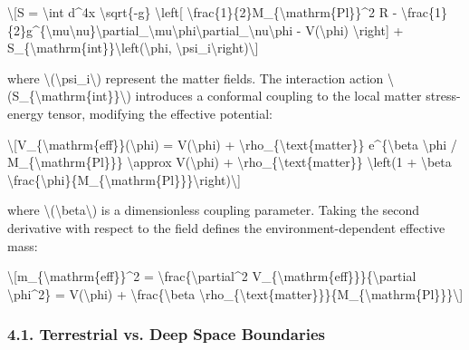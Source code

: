 \documentclass[
  10pt,
]{article}
\begin{document}
\textbackslash{[}S = \textbackslash int d\^{}4x
\textbackslash sqrt\{-g\} \textbackslash left{[}
\textbackslash frac\{1\}\{2\}M\_\{\textbackslash mathrm\{Pl\}\}\^{}2 R -
\textbackslash frac\{1\}\{2\}g\^{}\{\textbackslash mu\textbackslash nu\}\textbackslash partial\_\textbackslash mu\textbackslash phi\textbackslash partial\_\textbackslash nu\textbackslash phi
- V(\textbackslash phi) \textbackslash right{]} +
S\_\{\textbackslash mathrm\{int\}\}\textbackslash left(\textbackslash phi,
\textbackslash psi\_i\textbackslash right)\textbackslash{]}

where \textbackslash(\textbackslash psi\_i\textbackslash) represent the
matter fields. The interaction action
\textbackslash(S\_\{\textbackslash mathrm\{int\}\}\textbackslash)
introduces a conformal coupling to the local matter stress-energy
tensor, modifying the effective potential:

\textbackslash{[}V\_\{\textbackslash mathrm\{eff\}\}(\textbackslash phi)
= V(\textbackslash phi) +
\textbackslash rho\_\{\textbackslash text\{matter\}\}
e\^{}\{\textbackslash beta \textbackslash phi /
M\_\{\textbackslash mathrm\{Pl\}\}\} \textbackslash approx
V(\textbackslash phi) +
\textbackslash rho\_\{\textbackslash text\{matter\}\}
\textbackslash left(1 + \textbackslash beta
\textbackslash frac\{\textbackslash phi\}\{M\_\{\textbackslash mathrm\{Pl\}\}\}\textbackslash right)\textbackslash{]}

where \textbackslash(\textbackslash beta\textbackslash) is a
dimensionless coupling parameter. Taking the second derivative with
respect to the field defines the environment-dependent effective mass:

\textbackslash{[}m\_\{\textbackslash mathrm\{eff\}\}\^{}2 =
\textbackslash frac\{\textbackslash partial\^{}2
V\_\{\textbackslash mathrm\{eff\}\}\}\{\textbackslash partial
\textbackslash phi\^{}2\} =
V\textquotesingle\textquotesingle(\textbackslash phi) +
\textbackslash frac\{\textbackslash beta
\textbackslash rho\_\{\textbackslash text\{matter\}\}\}\{M\_\{\textbackslash mathrm\{Pl\}\}\}\textbackslash{]}

\hypertarget{terrestrial-vs.-deep-space-boundaries}{%
\subsubsection{4.1. Terrestrial vs. Deep Space
Boundaries}\label{terrestrial-vs.-deep-space-boundaries}}
\end{document}

